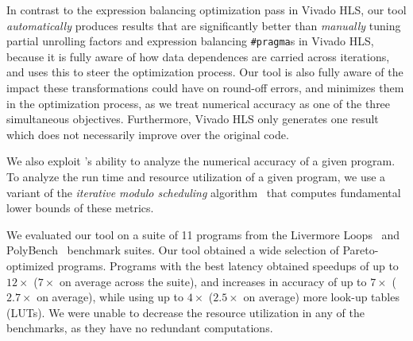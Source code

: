 In contrast to the expression balancing optimization pass in Vivado HLS,
our tool \emph{automatically} produces results that are significantly
better than \emph{manually} tuning partial unrolling factors and expression
balancing \verb|#pragma|s in Vivado HLS, because it is fully aware of how
data dependences are carried across iterations, and uses this to steer the
optimization process.  Our tool is also fully aware of the impact these
transformations could have on round-off errors, and minimizes them in the
optimization process, as we treat numerical accuracy as one of the three
simultaneous objectives.  Furthermore, Vivado HLS only generates one result
which does not necessarily improve over the original code.

We also exploit \SOAP{}'s ability
to analyze the numerical accuracy of a given program.  To analyze the run
time and resource utilization of a given program, we use a variant of the
\emph{iterative modulo scheduling} algorithm~\cite{rau94} that computes
fundamental lower bounds of these metrics.

We evaluated our tool on a suite of 11 programs from the Livermore
Loops~\cite{livermore} and PolyBench~\cite{polybench} benchmark suites.  Our
tool obtained a wide selection of Pareto-optimized programs.  Programs with
the best latency obtained speedups of up to $12\times$ ($7\times$ on average
across the suite), and increases in accuracy of up to $7\times$ ($2.7\times$
on average), while using up to $4\times$ ($2.5\times$ on average) more look-up
tables (LUTs).  We were unable to decrease the resource utilization in any of
the benchmarks, as they have no redundant computations.

